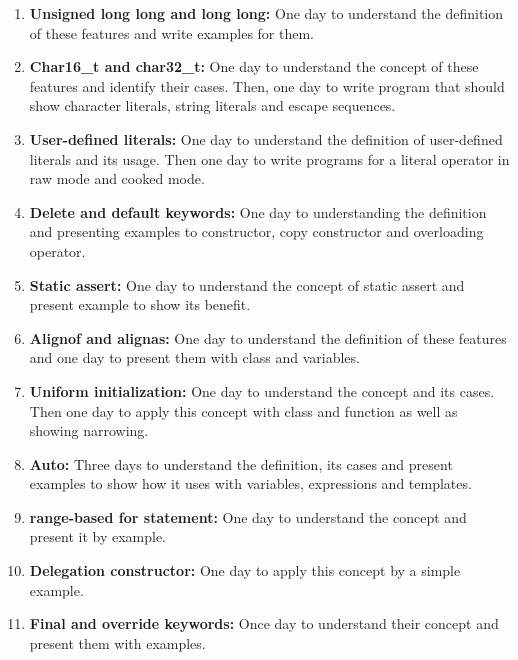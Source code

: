 \documentclass[11pt]{report}
\begin{document}
\begin{enumerate}
\item \textbf{Unsigned long long and long long:} One day to understand the \linebreak definition of these features and write examples for them.

\item \textbf{Char16\_t and char32\_t:} One day to understand the concept of these features and identify their cases. Then, one day to write program that should show character literals, string literals  and escape sequences.

\item \textbf{User-defined literals:} One day to understand the definition of \linebreak user-defined literals and its usage. Then one day to write programs for a literal operator in raw mode  and cooked mode.

\item \textbf{Delete and default keywords:} One day to understanding the definition and presenting examples to constructor, copy constructor and overloading operator.

\item \textbf{Static assert:} One day to understand the concept of static assert and present example to show its benefit.

\item \textbf{Alignof and alignas:} One day to understand the definition of these features and one day to present them with class and variables.

\item \textbf{Uniform initialization:} One day to understand the concept and its cases. Then one day to apply this concept with class and function as well as showing narrowing.

\item \textbf{Auto:} Three days to understand the definition, its cases and present examples to show how it uses with variables, expressions and templates.

\item  \textbf{range-based for statement:} One day to understand the concept and present it by example.

\item \textbf{Delegation constructor:} One day to apply this concept by a simple example.

\item \textbf{Final and override keywords:} Once day to understand their concept and present them with examples.


\end{enumerate}
\end{document}
